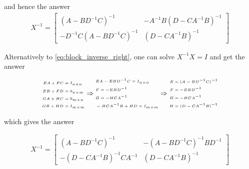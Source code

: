 and hence the answer
\begin{align}
	X^{-1} = \begin{bmatrix}
		(A - B D^{-1} C)^{-1} & -A^{-1} B (D - C A^{-1} B)^{-1} \\
		-D^{-1} C (A - B D^{-1} C)^{-1}  & (D - C A^{-1} B)^{-1}
	\end{bmatrix}
\end{align}

Alternatively to \autoref{eq:block_inverse_right}, one can solve $X^{-1} X = I$ and get the answer 

\begin{align*}
	\begin{tiny}
		\begin{aligned}
			E A + F C &= I_{n \times n} \\
			E B + F D &= 0_{n \times m} \\
			G A + H C &= 0_{m \times n} \\
			G B + H D &= I_{m \times m}
		\end{aligned}
		\Rightarrow
		\begin{aligned}
			&E A -E B D^{-1} C = I_{n \times n} \\
			&F = -E B D^{-1} \\
			&G = - H C A^{-1} \\
			&- H C A^{-1} B + H D = I_{m \times m}
		\end{aligned}
		\Rightarrow
		\begin{aligned}
			E &= (A - B D^{-1} C)^{-1} \\
			F &= -E B D^{-1} \\
			G &= - H C A^{-1} \\
			H &= (D - C A^{-1} B)^{-1}
		\end{aligned}
	\end{tiny}
\end{align*}

which gives the answer

\begin{align}
	X^{-1} = \begin{bmatrix}
		(A - B D^{-1} C)^{-1} & -(A - B D^{-1} C)^{-1} B D^{-1} \\
		-(D - C A^{-1} B)^{-1} C A^{-1}  & (D - C A^{-1} B)^{-1}
	\end{bmatrix}
\end{align}
